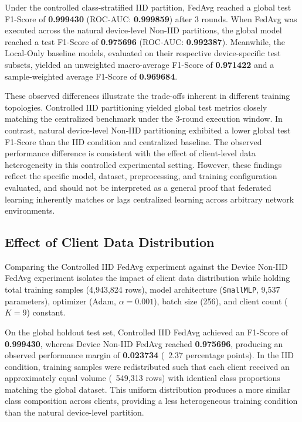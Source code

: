 \documentclass[11pt,a4paper]{article}
\begin{document}
Under the controlled class-stratified IID partition, FedAvg reached a global test F1-Score of \textbf{0.999430} (ROC-AUC: \textbf{0.999859}) after 3 rounds. When FedAvg was executed across the natural device-level Non-IID partitions, the global model reached a test F1-Score of \textbf{0.975696} (ROC-AUC: \textbf{0.992387}). Meanwhile, the Local-Only baseline models, evaluated on their respective device-specific test subsets, yielded an unweighted macro-average F1-Score of \textbf{0.971422} and a sample-weighted average F1-Score of \textbf{0.969684}.

These observed differences illustrate the trade-offs inherent in different training topologies. Controlled IID partitioning yielded global test metrics closely matching the centralized benchmark under the 3-round execution window. In contrast, natural device-level Non-IID partitioning exhibited a lower global test F1-Score than the IID condition and centralized baseline. The observed performance difference is consistent with the effect of client-level data heterogeneity in this controlled experimental setting. However, these findings reflect the specific model, dataset, preprocessing, and training configuration evaluated, and should not be interpreted as a general proof that federated learning inherently matches or lags centralized learning across arbitrary network environments.

\subsection{Effect of Client Data Distribution}
Comparing the Controlled IID FedAvg experiment against the Device Non-IID FedAvg experiment isolates the impact of client data distribution while holding total training samples (4,943,824 rows), model architecture (\texttt{SmallMLP}, 9,537 parameters), optimizer (Adam, $\alpha = 0.001$), batch size (256), and client count ($K = 9$) constant.

On the global holdout test set, Controlled IID FedAvg achieved an F1-Score of \textbf{0.999430}, whereas Device Non-IID FedAvg reached \textbf{0.975696}, producing an observed performance margin of \textbf{0.023734} (~2.37 percentage points). In the IID condition, training samples were redistributed such that each client received an approximately equal volume (~549,313 rows) with identical class proportions matching the global dataset. This uniform distribution produces a more similar class composition across clients, providing a less heterogeneous training condition than the natural device-level partition.
\end{document}

